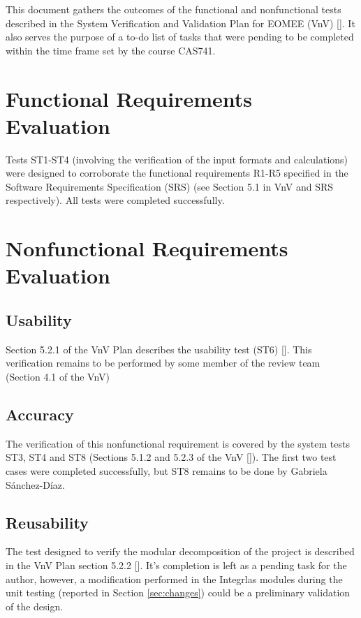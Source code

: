 \documentclass[12pt, titlepage]{article}
\begin{document}

This document gathers the outcomes of the functional and nonfunctional tests 
described in the System Verification and Validation Plan for EOMEE (VnV) 
[\cite{VnV2020}]. It also serves the purpose of a to-do list of tasks that were 
pending to be completed within the time frame set by the course CAS741.

\section{Functional Requirements Evaluation}
Tests ST1-ST4 (involving the verification of the input formats and 
calculations) were designed to corroborate the functional requirements R1-R5 
specified in the Software Requirements Specification (SRS) (see Section 5.1 in 
VnV and SRS respectively). All tests were completed successfully.

\section{Nonfunctional Requirements Evaluation}

\subsection{Usability}
Section 5.2.1 of the VnV Plan describes the usability test (ST6) 
[\cite{VnV2020}]. This verification remains to be performed by some member of 
the review team (Section 4.1 of the VnV)
		 
\subsection{Accuracy}
The verification of this nonfunctional requirement is covered by the system 
tests ST3, ST4 and ST8 (Sections 5.1.2 and 5.2.3 of the VnV [\cite{VnV2020}]). 
The first two test cases were completed successfully, but ST8 remains to be 
done by Gabriela S\'anchez-D\'iaz.

\subsection{Reusability}
The test designed to verify the modular decomposition of the project is 
described in the VnV Plan section 5.2.2 [\cite{VnV2020}]. It's completion is 
left as a pending task for the author, however, a modification performed in the 
Integrlas modules during the unit testing (reported in Section 
\ref{sec:changes}) could be a preliminary validation of the design.
\end{document}
